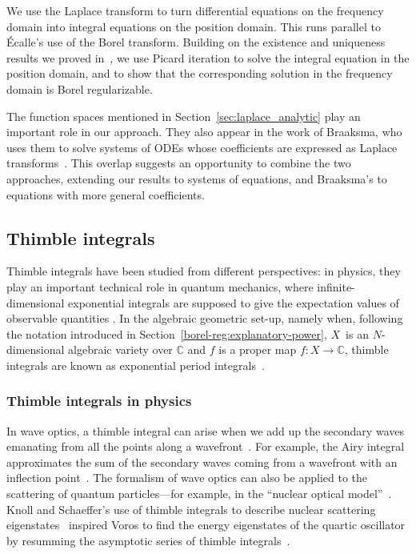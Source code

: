 \documentclass[10pt,a4paper]{amsart}
\newcommand{\maps}{\colon}
\newcommand{\C}{\mathbb{C}}
\numberwithin{equation}{section}
\begin{document}
We use the Laplace transform to turn differential equations on the frequency domain into integral equations on the position domain. This runs parallel to \'{E}calle's use of the Borel transform. Building on the existence and uniqueness results we proved in~\cite{reg-sing-volterra}, we use Picard iteration to solve the integral equation in the position domain, and to show that the corresponding solution in the frequency domain is Borel regularizable.

The function spaces mentioned in Section~\ref{sec:laplace_analytic} play an important role in our approach. They also appear in the work of Braaksma, who uses them to solve systems of ODEs whose coefficients are expressed as Laplace transforms~\cite{braaksma2006laplace}. This overlap suggests an opportunity to combine the two approaches, extending our results to systems of equations, and Braaksma's to equations with more general coefficients.
%
\subsection{Thimble integrals}
%
Thimble integrals have been studied from different perspectives: in physics, they play an important technical role in quantum mechanics, where infinite-dimensional exponential integrals are supposed to give the expectation values of observable quantities \cite{dunne-unsal2,dunne-unsal,Fauvet_Menous_Queva,Tanizaki:2014tua}. In the algebraic geometric set-up, namely when, following the notation introduced in Section~\ref{borel-reg:explanatory-power}, $X$~is an $N$-dimensional algebraic variety over $\C$ and $f$ is a proper map $f\maps X\to\C$, thimble integrals are known as exponential period integrals~\cite{deligne2007singularites,Maxim_lectures,kontsevich-Fourier-exact,kontsevich2024holomorphic,fresan-notes}.
\subsubsection{Thimble integrals in physics}
In wave optics, a thimble integral can arise when we add up the secondary waves emanating from all the points along a wavefront~\cite{Fenyes-ihes-lecture}. For example, the Airy integral approximates the sum of the secondary waves coming from a wavefront with an inflection point~\cite{rainbows+glories}. The formalism of wave optics can also be applied to the scattering of quantum particles---for example, in the ``nuclear optical model''~\cite{nuclear-mie,nuclear-optical}. Knoll and Schaeffer's use of thimble integrals to describe nuclear scattering eigenstates~\cite{semiclass-scat} inspired Voros to find the energy eigenstates of the quartic oscillator by resumming the asymptotic series of thimble integrals~\cite{quartic-return}.
\end{document}
